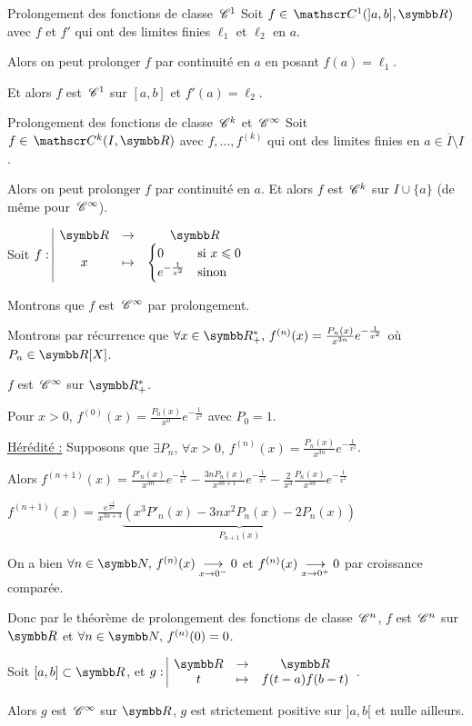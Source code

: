 \begin{theoreme}{Prolongement des fonctions de classe $\,\mathscr C^{1}$}{}
    Soit $f \in \mc 1(]a, b], \R)$ avec $f$ et $f'$ qui ont des limites finies 
    $\ell_1$ et $\ell_2$ en $a$. 

    Alors on peut prolonger $f$ par continuité en $a$ en posant $f(a) = \ell_1$.

    Et alors $f$ est $\,\mathscr C^{1}$ sur $[a, b]$ et $f'(a) = \ell_2$.
\end{theoreme}

\begin{theoreme}{Prolongement des fonctions de classe $\,\mathscr C^{k}$ et $\,\mathscr C^{\infty}$}{}
    Soit $f \in \mc k(I, \R)$ avec $f,\dots,f^{(k)}$ qui ont des limites finies en $a \in \overline{I} \setminus I$. 

    Alors on peut prolonger $f$ par continuité en $a$.
    Et alors $f$ est $\,\mathscr C^{k}$ sur $I \cup \{a\}$ (de même pour $\,\mathscr C^{\infty}$).
\end{theoreme}

\begin{exemple}
    Soit $\fonction f \R \R x {\begin{cases}
        0 & \text{si } x \leqslant 0\\
        e^{-\frac{1}{x^2}} & \text{sinon}
    \end{cases}}$

    Montrons que $f$ est $\,\mathscr C^{\infty}$ par prolongement.

    Montrons par récurrence que $\forall x \in \R_+^*, \, f^{(n)}(x) = \frac{P_n(x) }{x^{3n}} e^{-\frac{1}{x^2}}$ où $P_n \in \R [X]$. 

    $f$ est $\,\mathscr C^{\infty}$ sur $\R_+^*$. 

    Pour $x > 0$, $f^{(0)}(x) = \frac{P_0(x )}{x^0} e^{-\frac{1}{x^2}}$ avec $P_0 = 1$.

    \uline{Hérédité :} Supposons que $\displaystyle \exists P_n, \, \forall x > 0, \, f^{(n)}(x) = \frac{P_n(x)}{x^{3n}} e^{-\frac{1}{x^2}}$.

    Alors $\displaystyle f^{(n+1)}(x) = \frac{P'_n(x)}{x^{3n}} e^{-\frac{1}{x^2}}  - \frac{3n P_n(x)}{x^{3n + 1}}e^{-\frac{1}{x^2}} - \frac 2 {x^3} \frac{P_n(x)}{x^{3n}}e^{-\frac{1}{x^2}}$

    $f^{(n+1)}(x) = \frac{e^{\frac{-1}{x^2}}}{x^{3n + 3}} \underbrace{\left( x^3 P'_n(x) - 3nx^2 P_n(x) - 2P_n(x) \right)}_{P_{n+1}(x)}$

    On a bien $\forall n \in \N, \, f^{(n)}(x) \limit x {0^-} 0 $ et $f^{(n)}(x) \underset{x \to 0^+}{\longrightarrow} 0$ par croissance comparée. 

    Donc par le théorème de prolongement des fonctions de classe $\,\mathscr C^{n}$, $f$ est $\,\mathscr C^{n}$ sur $\R$ et $\forall n \in \N, \, f^{(n)}(0) = 0$.


    Soit $[a, b] \subset \R$, et $\fonction g \R \R t {f(t-a)f(b-t)}$.

    Alors $g$ est $\,\mathscr C^{\infty}$ sur $\R$, $g$ est strictement positive sur $]a, b[$ et nulle ailleurs.
\end{exemple}

